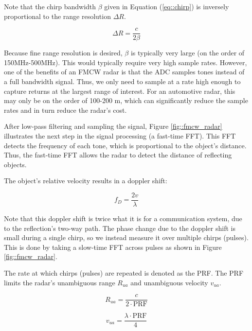 \documentclass[conference]{IEEEtran}
\begin{document}
	Note that the chirp bandwidth $\beta$ given in Equation (\ref{eq::chirp}) is inversely proportional to the range resolution ${\Delta}R$.
	
	\begin{equation}
		{\Delta}R = \frac{c}{2\beta}
		\label{eq::range_resolution}
	\end{equation}
	
	Because fine range resolution is desired, $\beta$ is typically very large (on the order of 150MHz-500MHz). This would typically require very high sample rates. However, one of the benefits of an FMCW radar is that the ADC samples tones instead of a full bandwidth signal. Thus, we only need to sample at a rate high enough to capture returns at the largest range of interest. For an automotive radar, this may only be on the order of 100-200 m, which can significantly reduce the sample rates and in turn reduce the radar's cost.
	
	After low-pass filtering and sampling the signal, Figure \ref{fig::fmcw_radar} illustrates the next step in the signal processing (a fast-time FFT). This FFT detects the frequency of each tone, which is proportional to the object's distance. Thus, the fast-time FFT allows the radar to detect the distance of reflecting objects.
	
	The object's relative velocity results in a doppler shift:
	
	\begin{equation}
		f_D = \frac{2v}{\lambda}
	\end{equation}
	
	Note that this doppler shift is twice what it is for a communication system, due to the reflection's two-way path. The phase change due to the doppler shift is small during a single chirp, so we instead measure it over multiple chirps (pulses). This is done by taking a slow-time FFT across pulses as shown in Figure \ref{fig::fmcw_radar}.
	
	The rate at which chirps (pulses) are repeated is denoted as the PRF. The PRF limits the radar's unambiguous range $R_{ua}$ and unambiguous velocity $v_{ua}$.
	
	\begin{equation}
		R_{ua} = \frac{c}{2\cdot\text{PRF}}
		\label{eq::unambig_range}
	\end{equation}
	
	\begin{equation}
		v_{ua} = \frac{\lambda\cdot\text{PRF}}{4}
		\label{eq::unambig_velocity}
	\end{equation}
	
\end{document}
